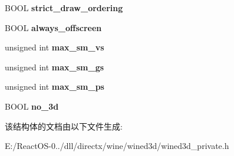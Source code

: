 \begin{DoxyCompactItemize}
B\+O\+OL {\bfseries strict\+\_\+draw\+\_\+ordering}
\item 
\mbox{\label{structwined3d__settings_a0b9d7a92365d7d45aa9be3b2c1b30088}} 
B\+O\+OL {\bfseries always\+\_\+offscreen}
\item 
\mbox{\label{structwined3d__settings_a23bb6a3d074cd83a6e1e3ad5d9f3ad5a}} 
unsigned int {\bfseries max\+\_\+sm\+\_\+vs}
\item 
\mbox{\label{structwined3d__settings_ab7c9a49794ef77f9089157b8cf5fa047}} 
unsigned int {\bfseries max\+\_\+sm\+\_\+gs}
\item 
\mbox{\label{structwined3d__settings_a686a30b6e6e99ba63b011c7f4610c1e0}} 
unsigned int {\bfseries max\+\_\+sm\+\_\+ps}
\item 
\mbox{\label{structwined3d__settings_aa88ba16307c3c4077e3f1db8a2cdee38}} 
B\+O\+OL {\bfseries no\+\_\+3d}
\end{DoxyCompactItemize}


该结构体的文档由以下文件生成\+:\begin{DoxyCompactItemize}
\item 
E\+:/\+React\+O\+S-\/0../dll/directx/wine/wined3d/wined3d\+\_\+private.\+h\end{DoxyCompactItemize}
